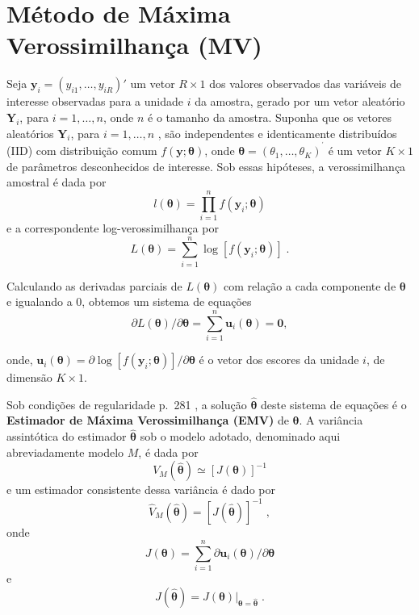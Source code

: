 \documentclass[]{book}
\theoremstyle{definition}
\theoremstyle{definition}
\theoremstyle{definition}
\theoremstyle{remark}
\begin{document}
\section{Método de Máxima Verossimilhança
(MV)}\label{metodo-de-maxima-verossimilhanca-mv}

Seja \(\mathbf{y}_{i}=\left(y_{i1},\ldots,y_{iR}\right)'\) um vetor
\(R\times 1\) dos valores observados das variáveis de interesse
observadas para a unidade \(i\) da amostra, gerado por um vetor
aleatório \(\mathbf{Y}_{i}\), para \(i=1,\ldots ,n\), onde \(n\) é o
tamanho da amostra. Suponha que os vetores aleatórios
\(\mathbf{Y}_{i}\), para \(i=1,\ldots ,n\) , são independentes e
identicamente distribuídos (IID) com distribuição comum
\(f(\mathbf{y};\mathbf{\theta })\), onde
\(\mathbf{\theta}=\left( \theta _{1},\ldots ,\theta _{K}\right) ^{^{\prime }}\)
é um vetor \(K\times 1\) de parâmetros desconhecidos de interesse. Sob
essas hipóteses, a verossimilhança amostral é dada por \[
l\left( \mathbf{\theta }\right) =\prod\limits_{i=1}^{n}f\left( \mathbf{y}
_{i};\mathbf{\theta }\right) 
\] e a correspondente log-verossimilhança por \[
L\left( \mathbf{\theta }\right) =\sum_{i=1}^n\log \left[
f\left( \mathbf{y}_{i};\mathbf{\theta }\right) \right] \;. 
\]

Calculando as derivadas parciais de \(L\left(\mathbf{\theta}\right)\)
com relação a cada componente de \(\mathbf{\theta }\) e igualando a
\(0\), obtemos um sistema de equações \[
\partial L\left( \mathbf{\theta }\right) /\partial \mathbf{\theta }=
\sum_{i=1}^n\mathbf{u}_{i}\left( \mathbf{\theta }\right) =\mathbf{0}, 
\]

onde,
\(\mathbf{u}_{i}\left(\mathbf{\theta }\right) =\partial\log\left[f\left(\mathbf{y}_{i};\mathbf{\theta}\right) \right] /\partial \mathbf{\theta }\)
é o vetor dos escores da unidade \(i\), de dimensão \(K\times1\).

Sob condições de regularidade p.~281 \citep{cox}, a solução
\(\mathbf{\hat{\theta}}\) deste sistema de equações é o
\textbf{Estimador de Máxima Verossimilhança (EMV)} de
\(\mathbf{\theta}\). A variância assintótica do estimador
\(\mathbf{\hat{\theta}}\) sob o modelo adotado, denominado aqui
abreviadamente modelo \(M\), é dada por \[
V_{M}\left( \mathbf{\hat{\theta}}\right) \simeq \left[ J\left( \mathbf{
\theta }\right) \right] ^{-1} 
\] e um estimador consistente dessa variância é dado por \[
\hat{V}_{M}\left( \mathbf{\hat{\theta}}\right) =\left[ J\left( \mathbf{\hat{
\theta}}\right) \right] ^{-1}\;, 
\] onde \[
J\left( \mathbf{\theta }\right) =\sum\limits_{i=1}^{n}\partial \mathbf{u}
_{i}\left( \mathbf{\theta }\right) /\partial \mathbf{\theta } 
\] e \[
J\left( \mathbf{\hat{\theta}}\right) =\left. J\left( \mathbf{\theta }\right)
\right| _{\mathbf{\theta =\hat{\theta}}}\;. 
\]
\end{document}
